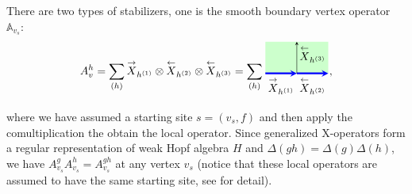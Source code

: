 \documentclass[a4paper,11pt]{article}
\theoremstyle{theorem}
\theoremstyle{remark}
\newcommand{\Av}{\mathbb{A}}
\newcommand{\XR}{\overset{\rightarrow}{X}}
\newcommand{\XL}{\overset{\leftarrow}{X}}
\newcommand{\cone}{(1)}
\newcommand{\ctwo}{(2)}
\newcommand{\cthree}{(3)}
\begin{document}
There are two types of stabilizers, one is the smooth boundary vertex operator \(\Av_{v_s}\):
\begin{align}
 A_v^h=\sum_{(h)}\XR_{h^{\cone}} \otimes \XL_{h^{\ctwo}} \otimes \XL_{h^{\cthree}}   
 = \sum_{(h)}\begin{aligned}
           \begin{tikzpicture}
    \begin{scope}[rotate=90] %
        \fill[green!20] (0, 0) rectangle (1,2); %
        \draw[-stealth,blue,line width = 1.6pt] (0,1) -- (0,0);
        \draw[-stealth,blue,line width = 1.6pt] (0,2) -- (0,1); 
        \draw[-stealth,black] (0,1) -- (1,1); 
       	\node[ line width=0.2pt, dashed, draw opacity=0.5] (a) at (-0.4,0.5){$\XL_{h^{\ctwo}} $};
    		\node[ line width=0.2pt, dashed, draw opacity=0.5] (a) at (-0.4,1.5){$\XR_{h^{\cone}}$};
            \node[ line width=0.2pt, dashed, draw opacity=0.5] (a) at (0.6,0.5){$\XL_{h^{\cthree}}$};
    \end{scope}
\end{tikzpicture}
 \end{aligned},
\end{align}
where we have assumed a starting site $s=(v_s,f)$ and then apply the comultiplication the obtain the local operator. Since generalized X-operators form a regular representation of weak Hopf algebra $H$ and $\Delta(gh)=\Delta(g)\Delta(h)$, we have $A_{v_s}^gA_{v_s}^h=A^{gh}_{v_s}$ at any vertex $v_s$ (notice that these local operators are assumed to have the same starting site, see \cite{Jia2023weak} for detail).
\end{document}
